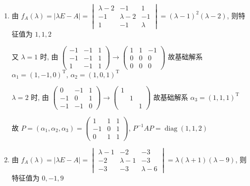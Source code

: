 	 \paragraph{} %
		 \begin{enumerate}
			 \item %
			       由 \( f_{A}(\lambda) = |\lambda E - A| = \begin{vmatrix}
				       \lambda - 2 & -1          & 1       \\
				       -1          & \lambda - 2 & -1      \\
				       1           & -1          & \lambda
			       \end{vmatrix} = (\lambda - 1)^{2}(\lambda - 2) \), 则特征值为 \( 1, 1, 2 \)

			       又 \( \lambda = 1 \) 时, 由 \( \begin{pmatrix}
				       -1 & -1 & 1 \\
				       -1 & -1 & 1 \\
				       1  & -1 & 1
			       \end{pmatrix} \rightarrow \begin{pmatrix}
				       1 & 1 & -1 \\
				       0 & 0 & 0  \\
				       0 & 0 & 0
			       \end{pmatrix} \) 故基础解系 \( \alpha_{1} = (1, -1, 0)^{\mathrm{T}} \), \( \alpha_{2} = (1, 0, 1)^{\mathrm{T}} \)

			       \( \lambda = 2 \) 时, 由 \( \begin{pmatrix}
				       0  & -1 & 1 \\
				       -1 & 0  & 1 \\
				       -1 & -1 & 0
			       \end{pmatrix} \rightarrow \begin{pmatrix}
				       1 &   &   \\
				         & 1 &   \\
				         &   & 1
			       \end{pmatrix} \) 故基础解系 \( \alpha_{3} = (1, 1, 1)^{\mathrm{T}} \)

			       故 \( P = (\alpha_{1}, \alpha_{2}, \alpha_{3}) = \begin{pmatrix}
				       1  & 1 & 1 \\
				       -1 & 0 & 1 \\
				       0  & 1 & 1
			       \end{pmatrix} \), \( P^{-1}AP = \operatorname{diag}(1, 1, 2) \)
			 \item %
			       由 \( f_{A}(\lambda) = |\lambda E - A| = \begin{vmatrix}
				       \lambda - 1 & -2          & -3          \\
				       -2          & \lambda - 1 & -3          \\
				       -3          & -3          & \lambda - 6
			       \end{vmatrix} = \lambda(\lambda + 1)(\lambda - 9) \), 则特征值为 \( 0, -1, 9 \)


\end{enumerate}
